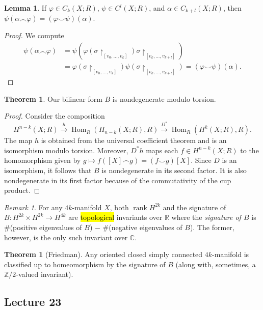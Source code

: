\documentclass[10pt,letterpaper,cm]{nupset}
\theoremstyle{definition}
\theoremstyle{theorem}
\newtheorem{theorem}[definition]{Theorem}
\newtheorem{lemma}[definition]{Lemma}
\theoremstyle{remark}
\newtheorem{remark}[definition]{Remark}
\newcommand{\C}{\mathbb C}
\newcommand{\R}{\mathbb{R}}
\newcommand{\Z}{\mathbb Z}
\newcommand{\1}{\mathbb{1}}
\newcommand{\0}{\vec 0}
\DeclareMathOperator{\rnk}{rank}
\begin{document}
\begin{lemma}
If $\varphi \in C_k(X; R)$, $\psi \in C^l(X; R)$, and $\alpha \in C_{k+l}(X; R)$, then $\psi(\alpha \frown \varphi) = (\varphi \smile \psi)(\alpha)$.
\end{lemma}
\begin{proof}
We compute
\begin{align*}
\psi(\alpha \frown \varphi) & = \psi(\varphi(\sigma \restriction_{[v_0, \ldots, v_k]})\sigma \restriction_{[v_k, \ldots, v_{k+l}]})
\\  & =  \varphi(\sigma \restriction_{[v_0, \ldots, v_k]})\psi(\sigma \restriction_{[v_k, \ldots, v_{k+l}]}) =  (\varphi \smile \psi)(\alpha)
.\end{align*}
\end{proof}

\begin{theorem}
Our bilinear form $B$ is nondegenerate modulo torsion.
\end{theorem}
\begin{proof}
Consider the composition $$H^{n-k}(X ; R) \stackrel{h}{\longrightarrow} \operatorname{Hom}_{R}\left(H_{n-k}(X ; R), R\right) \stackrel{D^{*}}{\longrightarrow} \operatorname{Hom}_{R}\left(H^{k}(X ; R), R\right).$$ The map $h$ is obtained from the universal coefficient theorem and is an isomorphism modulo torsion. Moreover, $D^{\ast}{h}$ maps each $f \in H^{n-k}(X;R)$ to the homomorphism given by $g \mapsto f([X] \frown g) = (f\smile g)[X]$. Since $D$ is an isomorphism, it follows that $B$ is nondegenerate in its second factor. It is also nondegenerate in its first factor because of the commutativity of the cup product. 
\end{proof}


\begin{remark}
For any $4k$-manifold $X$, both $\rnk{H^{2k}}$ and the signature of $B : H^{2k} \times H^{2k} \to H^{4k}$ are \hl{topological} invariants over $\R$ where the \textit{signature of $B$} is $\#$(positive eigenvalues of $B$) $-$ $\#$(negative eigenvalues of $B$). The former, however, is the only such invariant over $\C$.
\end{remark}

\begin{theorem}[Friedman]
Any oriented closed simply connected $4k$-manifold is classified up to homeomorphism by the signature of $B$ (along with, sometimes, a $\Z/2$-valued invariant).
\end{theorem}

\subsection{Lecture 23}
\end{document}
